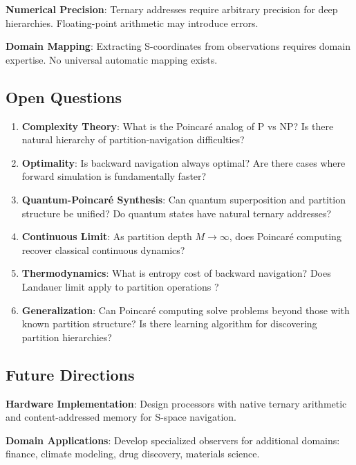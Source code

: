 \documentclass[twocolumn,10pt]{article}
\begin{document}
\textbf{Numerical Precision}: Ternary addresses require arbitrary precision for deep hierarchies. Floating-point arithmetic may introduce errors.

\textbf{Domain Mapping}: Extracting S-coordinates from observations requires domain expertise. No universal automatic mapping exists.

\subsection{Open Questions}

\begin{enumerate}
\item \textbf{Complexity Theory}: What is the Poincaré analog of P vs NP? Is there natural hierarchy of partition-navigation difficulties?

\item \textbf{Optimality}: Is backward navigation always optimal? Are there cases where forward simulation is fundamentally faster?

\item \textbf{Quantum-Poincaré Synthesis}: Can quantum superposition and partition structure be unified? Do quantum states have natural ternary addresses?

\item \textbf{Continuous Limit}: As partition depth $M \to \infty$, does Poincaré computing recover classical continuous dynamics?

\item \textbf{Thermodynamics}: What is entropy cost of backward navigation? Does Landauer limit apply to partition operations \cite{Landauer1961}?

\item \textbf{Generalization}: Can Poincaré computing solve problems beyond those with known partition structure? Is there learning algorithm for discovering partition hierarchies?
\end{enumerate}

\subsection{Future Directions}

\textbf{Hardware Implementation}: Design processors with native ternary arithmetic and content-addressed memory for S-space navigation.

\textbf{Domain Applications}: Develop specialized observers for additional domains: finance, climate modeling, drug discovery, materials science.
\end{document}

